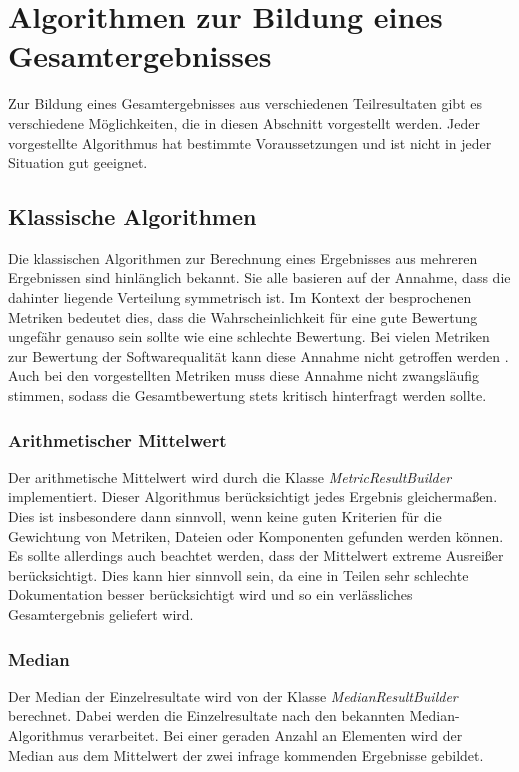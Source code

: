  \section{Algorithmen zur Bildung eines Gesamtergebnisses}
Zur Bildung eines Gesamtergebnisses aus verschiedenen Teilresultaten gibt es verschiedene Möglichkeiten, die in diesen Abschnitt vorgestellt werden. Jeder vorgestellte Algorithmus hat bestimmte Voraussetzungen und ist nicht in jeder Situation gut geeignet.

\subsection{Klassische Algorithmen}
Die klassischen Algorithmen zur Berechnung eines Ergebnisses aus mehreren Ergebnissen sind hinlänglich bekannt. Sie alle basieren auf der Annahme, dass die dahinter liegende Verteilung symmetrisch ist. Im Kontext der besprochenen Metriken bedeutet dies, dass die Wahrscheinlichkeit für eine gute Bewertung ungefähr genauso sein sollte wie eine schlechte Bewertung. Bei vielen Metriken zur Bewertung der Softwarequalität kann diese Annahme nicht getroffen werden \cite[S. 313]{Youcantcontroltheunfamiliar:Astudyontherelationsbetweenaggregationtechniquesforsoftwaremetrics}. Auch bei den vorgestellten Metriken muss diese Annahme nicht zwangsläufig stimmen, sodass die Gesamtbewertung stets kritisch hinterfragt werden sollte. 
\subsubsection{Arithmetischer Mittelwert}
Der arithmetische Mittelwert wird durch die Klasse \textit{MetricResultBuilder} implementiert. Dieser Algorithmus berücksichtigt jedes Ergebnis gleichermaßen. Dies ist insbesondere dann sinnvoll, wenn keine guten Kriterien für die Gewichtung von Metriken, Dateien oder Komponenten gefunden werden können. Es sollte allerdings auch beachtet werden, dass der Mittelwert extreme Ausreißer berücksichtigt. Dies kann hier sinnvoll sein, da eine in Teilen sehr schlechte Dokumentation besser berücksichtigt wird und so ein verlässliches Gesamtergebnis geliefert wird.


\subsubsection{Median}
Der Median der Einzelresultate wird von der Klasse \textit{MedianResultBuilder} berechnet. Dabei werden die Einzelresultate nach den bekannten Median-Algorithmus verarbeitet. Bei einer geraden Anzahl an Elementen wird der Median aus dem Mittelwert der zwei infrage kommenden Ergebnisse gebildet. 

